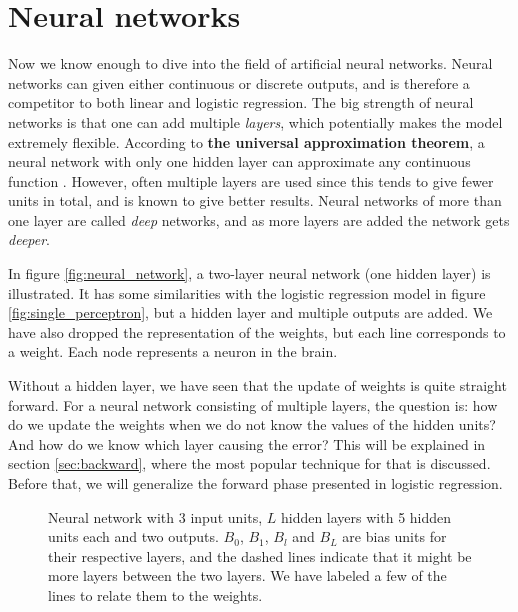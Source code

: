 \section{Neural networks} \label{sec:neural_network}
Now we know enough to dive into the field of artificial neural networks. Neural networks can given either continuous or discrete outputs, and is therefore a competitor to both linear and logistic regression. The big strength of neural networks is that one can add multiple \textit{layers}, which potentially makes the model extremely flexible. According to \textbf{the universal approximation theorem}, a neural network with only one hidden layer can approximate any continuous function \cite{hornik_multilayer_1989}. However, often multiple layers are used since this tends to give fewer units in total, and is known to give better results. Neural networks of more than one layer are called \textit{deep} networks, and as more layers are added the network gets \textit{deeper}.

In figure \eqref{fig:neural_network}, a two-layer neural network (one hidden layer) is illustrated. It has some similarities with the logistic regression model in figure \eqref{fig:single_perceptron}, but a hidden layer and multiple outputs are added. We have also dropped the representation of the weights, but each line corresponds to a weight. Each node represents a neuron in the brain.

Without a hidden layer, we have seen that the update of weights is quite straight forward. For a neural network consisting of multiple layers, the question is: how do we update the weights when we do not know the values of the hidden units? And how do we know which layer causing the error? This will be explained in section \ref{sec:backward}, where the most popular technique for that is discussed. Before that, we will generalize the forward phase presented in logistic regression.

\begin{figure}
	\centering
	
	\caption{Neural network with 3 input units, $L$ hidden layers with 5 hidden units each and two outputs. $B_0$, $B_1$, $B_l$ and $B_L$ are bias units for their respective layers, and the dashed lines indicate that it might be more layers between the two layers. We have labeled a few of the lines to relate them to the weights. }
	\label{fig:neural_network}
\end{figure}

